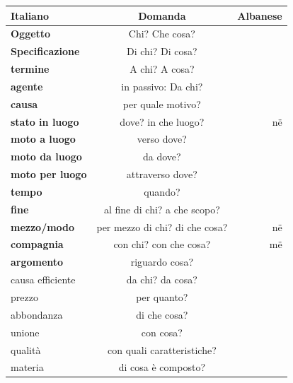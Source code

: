 \begin{table}[H]
    \centering
    \begin{tabular}{lcr}
        \toprule
        Italiano            & Domanda                   & Albanese \\
        \midrule
        \textbf{Oggetto}              & Chi? Che cosa?               &\\
        \textbf{Specificazione}      & Di chi? Di cosa?              &\\
        \textbf{termine}             & A chi? A cosa?                &\\
        \textbf{agente}              & in passivo: Da chi?           &\\
        \textbf{causa}               & per quale motivo?             &\\
        \textbf{stato in luogo}      & dove? in che luogo?           & në\\
        \textbf{moto a luogo}        & verso dove?                   &\\
        \textbf{moto da luogo}       & da dove?                      &\\
        \textbf{moto per luogo}      & attraverso dove?              &\\
        \textbf{tempo}               & quando?                       &\\
        \textbf{fine}                & al fine di chi? a che scopo?  &\\
        \textbf{mezzo/modo}          & per mezzo di chi? di che cosa?& në\\
        \textbf{compagnia}           & con chi? con che cosa?        & më\\
        \textbf{argomento}           & riguardo cosa?                &\\
        causa efficiente    & da chi? da cosa?              &\\
        prezzo              & per quanto?                   &\\
        abbondanza          & di che cosa?                  &\\
        unione              & con cosa?                     &\\
        qualità             & con quali caratteristiche?    &\\
        materia             & di cosa è composto?           &\\
        

\end{tabular}
\end{table}

